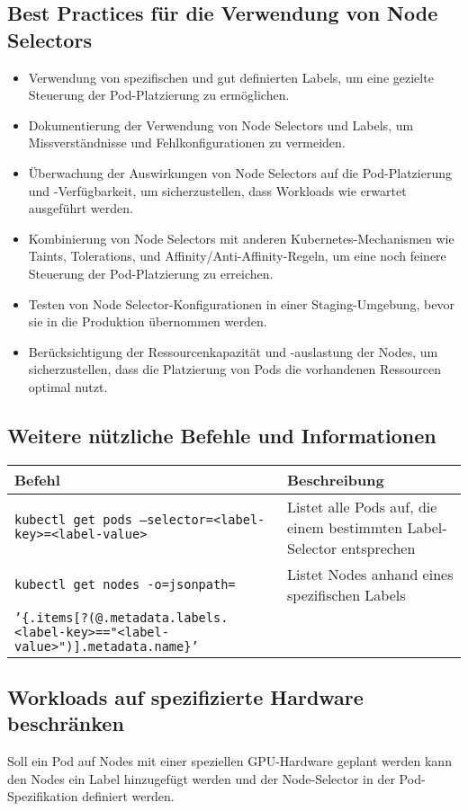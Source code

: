\subsection{Best Practices für die Verwendung von Node Selectors}
\begin{itemize}
    \item Verwendung von spezifischen und gut definierten Labels, um eine gezielte Steuerung der Pod-Platzierung zu ermöglichen.
    \item Dokumentierung der Verwendung von Node Selectors und Labels, um Missverständnisse und Fehlkonfigurationen zu vermeiden.
    \item Überwachung der Auswirkungen von Node Selectors auf die Pod-Platzierung und -Verfügbarkeit, um sicherzustellen, dass Workloads wie erwartet ausgeführt werden.
    \item Kombinierung von Node Selectors mit anderen Kubernetes-Mechanismen wie Taints, Tolerations, und Affinity/Anti-Affinity-Regeln, um eine noch feinere Steuerung der Pod-Platzierung zu erreichen.
    \item Testen von Node Selector-Konfigurationen in einer Staging-Umgebung, bevor sie in die Produktion übernommen werden.
    \item Berücksichtigung der Ressourcenkapazität und -auslastung der Nodes, um sicherzustellen, dass die Platzierung von Pods die vorhandenen Ressourcen optimal nutzt.
\end{itemize}

\subsection{Weitere nützliche Befehle und Informationen}
\begin{tabular}{|p{}|p{}|}
\hline
\textbf{Befehl} & \textbf{Beschreibung} \\
\hline
\texttt{kubectl get pods --selector=<label-key>=<label-value>} & Listet alle Pods auf, die einem bestimmten Label-Selector entsprechen \\
\texttt{kubectl get nodes -o=jsonpath=} & Listet Nodes anhand eines spezifischen Labels \\
\texttt{'\{.items[?(@.metadata.labels.<label-key>=="<label-value>")].metadata.name\}'} &  \\
\hline
\end{tabular}


\subsection{Workloads auf spezifizierte Hardware beschränken}
Soll ein Pod auf Nodes mit einer speziellen GPU-Hardware geplant werden kann den Nodes ein Label hinzugefügt werden und der Node-Selector in der Pod-Spezifikation definiert werden.\\
